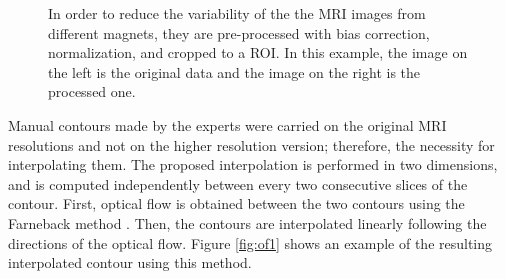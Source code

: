 \begin{figure}[h]
    \caption{In order to reduce the variability of the the MRI images from different magnets, they are pre-processed with bias correction, normalization, and cropped to a ROI.  In this example, the image on the left is the original data and the image on the right is the processed one. } \label{fig:roi}
\end{figure}

Manual contours made by the experts were carried on the original MRI resolutions and not on the higher resolution version; therefore, the necessity for interpolating them.  The proposed interpolation is performed in two dimensions, and is computed independently between every two consecutive slices of the contour.  First, optical flow is obtained between the two contours using the  Farneback method \parencite{optflow}. Then, the contours are interpolated linearly following the directions of the optical flow. Figure \ref{fig:of1} shows an example of the resulting interpolated contour using this method. 

